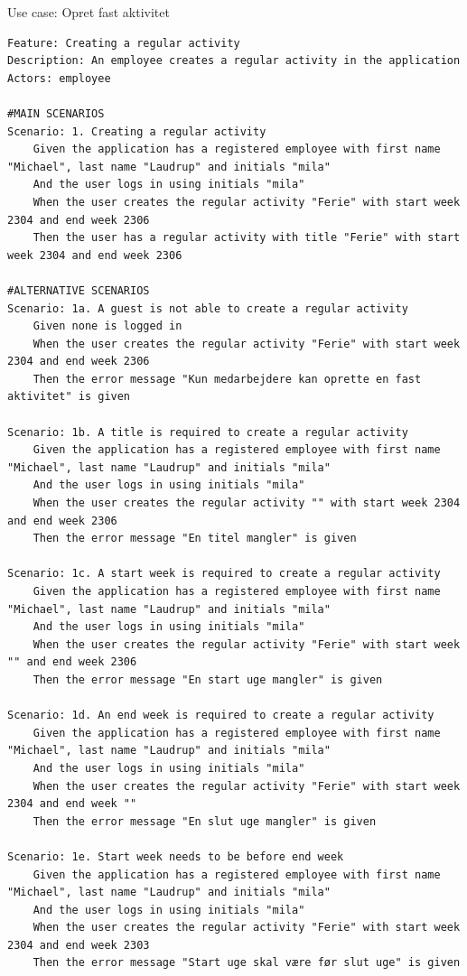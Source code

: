 \begin{listing}[H]
    \centering
    \caption{Use case: Opret fast aktivitet}\label{lst:usecase_regular_activity}
    \begin{verbatim}  
Feature: Creating a regular activity
Description: An employee creates a regular activity in the application
Actors: employee

#MAIN SCENARIOS
Scenario: 1. Creating a regular activity
    Given the application has a registered employee with first name "Michael", last name "Laudrup" and initials "mila"
    And the user logs in using initials "mila" 
    When the user creates the regular activity "Ferie" with start week 2304 and end week 2306
    Then the user has a regular activity with title "Ferie" with start week 2304 and end week 2306

#ALTERNATIVE SCENARIOS
Scenario: 1a. A guest is not able to create a regular activity
    Given none is logged in
    When the user creates the regular activity "Ferie" with start week 2304 and end week 2306
    Then the error message "Kun medarbejdere kan oprette en fast aktivitet" is given

Scenario: 1b. A title is required to create a regular activity
    Given the application has a registered employee with first name "Michael", last name "Laudrup" and initials "mila"
    And the user logs in using initials "mila"
    When the user creates the regular activity "" with start week 2304 and end week 2306
    Then the error message "En titel mangler" is given

Scenario: 1c. A start week is required to create a regular activity
    Given the application has a registered employee with first name "Michael", last name "Laudrup" and initials "mila"
    And the user logs in using initials "mila"
    When the user creates the regular activity "Ferie" with start week "" and end week 2306
    Then the error message "En start uge mangler" is given

Scenario: 1d. An end week is required to create a regular activity
    Given the application has a registered employee with first name "Michael", last name "Laudrup" and initials "mila"
    And the user logs in using initials "mila"
    When the user creates the regular activity "Ferie" with start week 2304 and end week ""
    Then the error message "En slut uge mangler" is given

Scenario: 1e. Start week needs to be before end week
    Given the application has a registered employee with first name "Michael", last name "Laudrup" and initials "mila"
    And the user logs in using initials "mila"
    When the user creates the regular activity "Ferie" with start week 2304 and end week 2303
    Then the error message "Start uge skal være før slut uge" is given


\end{verbatim}
\end{listing}
